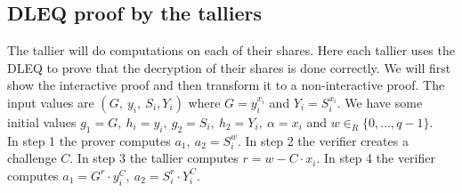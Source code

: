 \subsection{DLEQ proof by the talliers}
The tallier will do computations on each of their shares. Here each tallier uses the DLEQ to prove that the decryption of their shares is done correctly. We will first show the interactive proof and then transform it to a non-interactive proof. The input values are \begin{math}(G,\ y_i,\ S_i, Y_i)\end{math} where \begin{math}G = y_i^{x_i}\end{math} and  \begin{math} Y_i=S_i^{x_i}\end{math}. We have some initial values
 \begin{math}g_1 =G,\ h_i=y_i,\ g_2=S_i,\ h_2=Y_i,\ \alpha=x_i \end{math} and \begin{math}w \in_R \{0,...,q-1\}\end{math}.\\
 
 
 
\noindent 
In step 1 the prover computes \begin{math}a_1,\ a_2=S_i^w\end{math}. In step 2
the verifier creates a challenge \begin{math}C\end{math}. In step 3 the tallier computes \begin{math}r=w-C \cdot x_i\end{math}. In step 4 the verifier computes \begin{math}a_1=G^r \cdot y_i^C,\ a_2=S_i^r \cdot Y_i^C\end{math}.
 
 
 
